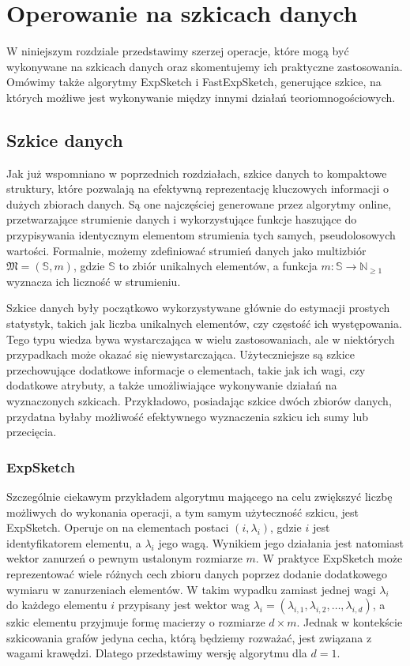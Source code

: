 \chapter{Operowanie na szkicach danych}
    W niniejszym rozdziale przedstawimy szerzej operacje, które mogą być wykonywane na szkicach danych oraz skomentujemy ich praktyczne zastosowania. Omówimy także algorytmy ExpSketch i FastExpSketch, generujące szkice, na których możliwe jest wykonywanie między innymi działań teoriomnogościowych.

\section{Szkice danych}
    Jak już wspomniano w poprzednich rozdziałach, szkice danych to kompaktowe struktury, które pozwalają na efektywną reprezentację kluczowych informacji o dużych zbiorach danych. Są one najczęściej generowane przez algorytmy online, przetwarzające strumienie danych i wykorzystujące funkcje haszujące do przypisywania identycznym elementom strumienia tych samych, pseudolosowych wartości. Formalnie, możemy zdefiniować strumień danych jako multizbiór $\mathfrak{M} = (\mathbb{S},m)$, gdzie $\mathbb{S}$ to zbiór unikalnych elementów, a funkcja $m : \mathbb{S} \rightarrow \mathbb{N}_{\geq 1}$ wyznacza ich liczność w strumieniu.

    Szkice danych były początkowo wykorzystywane głównie do estymacji prostych statystyk, takich jak liczba unikalnych elementów, czy częstość ich występowania. Tego typu wiedza bywa wystarczająca w wielu zastosowaniach, ale w niektórych przypadkach może okazać się niewystarczająca. Użyteczniejsze są szkice przechowujące dodatkowe informacje o elementach, takie jak ich wagi, czy dodatkowe atrybuty, a także umożliwiające wykonywanie działań na wyznaczonych szkicach. Przykładowo, posiadając szkice dwóch zbiorów danych, przydatna byłaby możliwość efektywnego wyznaczenia szkicu ich sumy lub przecięcia.  

\subsection{ExpSketch}
    Szczególnie ciekawym przykładem algorytmu mającego na celu zwiększyć liczbę możliwych do wykonania operacji, a tym samym użyteczność szkicu, jest ExpSketch\cite{Lemiesz_2021}. Operuje on na elementach postaci $(i, \lambda_{i})$, gdzie $i$ jest identyfikatorem elementu, a $\lambda_{i}$ jego wagą. Wynikiem jego działania jest natomiast wektor zanurzeń o pewnym ustalonym rozmiarze $m$. W praktyce ExpSketch może reprezentować wiele różnych cech zbioru danych poprzez dodanie dodatkowego wymiaru w zanurzeniach elementów. W takim wypadku zamiast jednej wagi $\lambda_i$ do każdego elementu $i$ przypisany jest wektor wag $\lambda_i = (\lambda_{i,1}, \lambda_{i,2}, \dots, \lambda_{i,d})$, a szkic elementu przyjmuje formę macierzy o rozmiarze $d \times m$. Jednak w kontekście szkicowania grafów jedyna cecha, którą będziemy rozważać, jest związana z wagami krawędzi. Dlatego przedstawimy wersję algorytmu dla $d = 1$.

